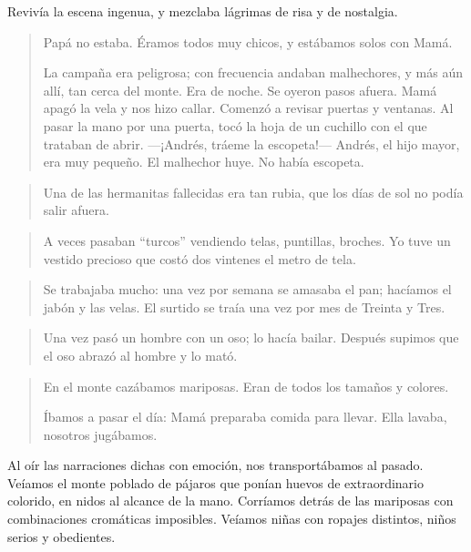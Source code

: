 \documentclass[a4paper]{article}
\begin{document}
Revivía la escena ingenua, y mezclaba lágrimas de risa y de nostalgia.

\begin{quote}
    Papá no estaba. Éramos todos muy chicos, y estábamos solos con Mamá.

    La campaña era peligrosa; con frecuencia andaban malhechores, y más aún allí, tan cerca del monte. Era de noche. Se oyeron pasos afuera. Mamá apagó la vela y nos hizo callar. Comenzó a revisar puertas y ventanas. Al pasar la mano por una puerta, tocó la hoja de un cuchillo con el que trataban de abrir. ---¡Andrés, tráeme la escopeta!--- Andrés, el hijo mayor, era muy pequeño. El malhechor huye. No había escopeta.
\end{quote}

\begin{quote}
    Una de las hermanitas fallecidas era tan rubia, que los días de sol no podía salir afuera.
\end{quote}

\begin{quote}
    A veces pasaban ``turcos'' vendiendo telas, puntillas, broches. Yo tuve un vestido precioso que costó dos vintenes el metro de tela.
\end{quote}

\begin{quote}
    Se trabajaba mucho: una vez por semana se amasaba el pan; ha\-cí\-amos el jabón y las velas. El surtido se traía una vez por mes de Treinta y Tres.
\end{quote}

\begin{quote}
    Una vez pasó un hombre con un oso; lo hacía bailar. Después supimos que el oso abrazó al hombre y lo mató.
\end{quote}

\begin{quote}
    En el monte cazábamos mariposas. Eran de todos los tamaños y colores.

    Íbamos a pasar el día: Mamá preparaba comida para llevar. Ella lavaba, nosotros jugábamos.
\end{quote}

Al oír las narraciones dichas con emoción, nos transportábamos al pasado. Veíamos el monte poblado de pájaros que ponían huevos de extraordinario colorido, en nidos al alcance de la mano. Corríamos detrás de las mariposas con combinaciones cromáticas imposibles. Veíamos niñas con ropajes distintos, niños serios y obedientes.
\end{document}
